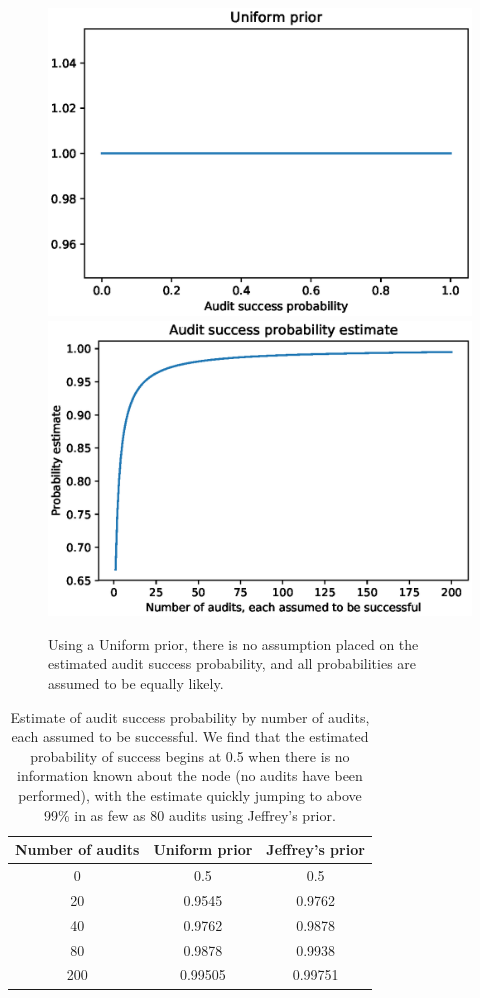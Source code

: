 \begin{figure}[!htbp]
    \centering
    \includegraphics[height=.22\textheight]{audit-success/uniform_prior.eps}
    \includegraphics[height=.22\textheight]{audit-success/uniform_estimate.eps}
\caption{Using a Uniform prior, there is no assumption placed on the estimated
audit success probability, and all probabilities are assumed to be equally likely.}
\label{fig:unif_prior}
\end{figure}

\begin{table}[!htbp]
\centering

\begin{tabular}{| c | c | c |}\hline
Number of audits & Uniform prior & Jeffrey's prior\\\hline
0 & 0.5 & 0.5 \\
20 & 0.9545 & 0.9762 \\
40 & 0.9762 & 0.9878 \\
80 & 0.9878 & 0.9938 \\
200 & 0.99505 & 0.99751 \\
\hline
\end{tabular}
\caption{Estimate of audit success probability by
number of audits, each assumed to be successful.
We find that the estimated probability of success begins at 0.5 when there is
no information known about the node (no audits have been performed),
with the estimate quickly jumping to above 99\% in as few as 80 audits using Jeffrey's prior.}
\end{table}

